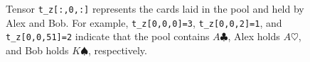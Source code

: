 \documentclass{article}
\newcommand{\pyvar}[1]{\texttt{#1}}
\begin{document}
\begin{figure}[h]
\caption{\small Tensor \pyvar{t\_z[:,0,:]} represents the cards laid in the pool and held by Alex and Bob. For example, \pyvar{t\_z[0,0,0]=3}, \pyvar{t\_z[0,0,2]=1}, and \pyvar{t\_z[0,0,51]=2} indicate that the pool contains $A\clubsuit$, Alex holds $A\heartsuit$, and Bob holds $K\spadesuit$, respectively.}
    \label{fig:card_cube}
\end{figure}
\end{document}
